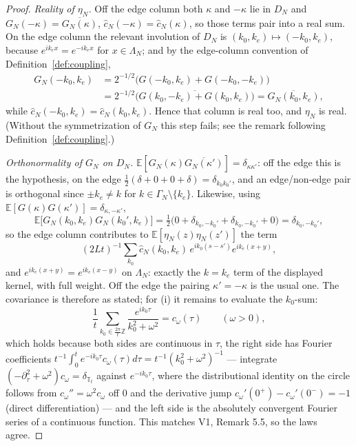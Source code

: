 \documentclass[11pt,a4paper]{article}
\theoremstyle{plain}
\theoremstyle{definition}
\newcommand{\Z}{\mathbb{Z}}
\newcommand{\T}{\mathbb{T}}
\newcommand{\E}{\mathbb{E}}
\begin{document}
\begin{proof}
\emph{Reality of $\eta_N$.} Off the edge column both $\kappa$ and $-\kappa$ lie in $D_N$
and $G_N(-\kappa)=\overline{G_N(\kappa)}$, $\hat c_N(-\kappa)=\hat c_N(\kappa)$, so those
terms pair into a real sum. On the edge column the relevant involution of $D_N$ is
$(k_0,k_e)\mapsto(-k_0,k_e)$, because $e^{ik_ex}=e^{-ik_ex}$ for $x\in\Lambda_N$; and
by the edge-column convention of Definition~\ref{def:coupling},
\[
 \begin{split}
 G_N(-k_0,k_e)&=2^{-1/2}\bigl(G(-k_0,k_e)+G(-k_0,-k_e)\bigr)\\
 &=2^{-1/2}\overline{\bigl(G(k_0,-k_e)+G(k_0,k_e)\bigr)}
 =\overline{G_N(k_0,k_e)},
 \end{split}
\]
while $\hat c_N(-k_0,k_e)=\hat c_N(k_0,k_e)$. Hence that column is real too, and
$\eta_N$ is real. (Without the symmetrization of $G_N$ this step fails; see the remark following
Definition~\ref{def:coupling}.)

\emph{Orthonormality of $G_N$ on $D_N$.} $\E[G_N(\kappa)\overline{G_N(\kappa')}]
=\delta_{\kappa\kappa'}$: off the edge this is the hypothesis, on the edge
$\tfrac12(\delta+0+0+\delta)=\delta_{k_0k_0'}$, and an edge/non-edge pair is orthogonal
since $\pm k_e\ne k$ for $k\in\Gamma_N\setminus\{k_e\}$. Likewise, using
$\E[G(\kappa)G(\kappa')]=\delta_{\kappa,-\kappa'}$,
\[
 \E\bigl[G_N(k_0,k_e)G_N(k_0',k_e)\bigr]
 =\tfrac12\bigl(0+\delta_{k_0,-k_0'}+\delta_{k_0,-k_0'}+0\bigr)=\delta_{k_0,-k_0'},
\]
so the edge column contributes to $\E[\eta_N(z)\eta_N(z')]$ the term
\[
 (2Lt)^{-1}\sum_{k_0}\hat c_N(k_0,k_e)\,e^{ik_0(s-s')}e^{ik_e(x+y)},
\]
and $e^{ik_e(x+y)}=e^{ik_e(x-y)}$ on $\Lambda_N$: exactly the $k=k_e$ term of
the displayed kernel, with full weight. Off the edge the pairing
$\kappa'=-\kappa$ is the usual one.
The covariance is therefore as stated; for (i) it remains to evaluate the $k_0$-sum:
\begin{equation}
 \frac1t\sum_{k_0\in\frac{2\pi}t\Z}\frac{e^{ik_0\tau}}{k_0^2+\omega^2}
 =c_\omega(\tau)\qquad(\omega>0),
 \label{eq:ML}
\end{equation}
which holds because both sides are continuous in $\tau$, the right side has
Fourier coefficients $t^{-1}\int_0^te^{-ik_0\tau}c_\omega(\tau)d\tau
=t^{-1}(k_0^2+\omega^2)^{-1}$ --- integrate
$(-\partial_\tau^2+\omega^2)c_\omega=\delta_{\T_t}$ against $e^{-ik_0\tau}$,
where the distributional identity on the circle follows from
$c_\omega''=\omega^2c_\omega$ off $0$ and the derivative jump
$c_\omega'(0^+)-c_\omega'(0^-)=-1$ (direct differentiation) --- and the left
side is the absolutely convergent Fourier series of a continuous function.
This matches V1, Remark 5.5, so the laws agree.
\end{proof}
\end{document}
